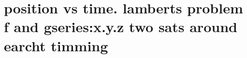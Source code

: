 \section{ position vs time. lamberts problem f and gseries:x.y.z two sats around earcht timming  }\label{sec:q3}    
